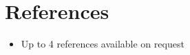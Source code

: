 \section{References}

\vspace{6pt}
 
\begin{itemize}
    
    \item{Up to 4 references available on request}
    
\end{itemize}